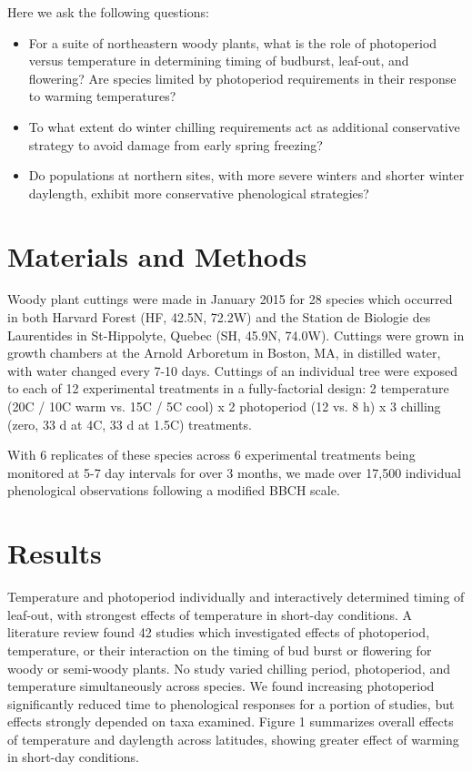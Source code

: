 \documentclass[11pt]{article}
\begin{document}
Here we ask the following questions:
\begin{itemize}
\item{For a suite of northeastern woody plants, what is the role of photoperiod versus temperature in determining timing of budburst, leaf-out, and flowering? Are species limited by photoperiod requirements in their response to warming temperatures?}
\item{To what extent do winter chilling requirements act as additional conservative strategy to avoid damage from early spring freezing?}
\item{Do populations at northern sites, with more severe winters and shorter winter daylength, exhibit more conservative phenological strategies?}
\end{itemize}



\section{Materials and Methods}

Woody plant cuttings were made in January 2015 for 28 species which occurred in both Harvard Forest (HF, 42.5\degree N, 72.2\degree W) and the Station de Biologie des Laurentides in St-Hippolyte, Quebec (SH, 45.9\degree N, 74.0\degree W). Cuttings were grown in growth chambers at the Arnold Arboretum in Boston, MA, in distilled water, with water changed every 7-10 days. Cuttings of an individual tree were exposed to each of 12 experimental treatments in a fully-factorial design: 2 temperature (20\degree C / 10\degree C warm vs. 15\degree C / 5\degree C cool) x 2 photoperiod (12 vs. 8 h) x 3 chilling (zero,  33 d at 4\degree C, 33 d at 1.5\degree C) treatments. 

With 6 replicates of these species across 6 experimental treatments being monitored at 5-7 day intervals for over 3 months, we made over 17,500 individual phenological observations following a modified BBCH scale.


\section{Results}

Temperature and photoperiod individually and interactively determined timing of leaf-out, with strongest effects of temperature in short-day conditions. A literature review found 42 studies which investigated effects of photoperiod, temperature, or their interaction on the timing of bud burst or flowering for woody or semi-woody plants.  No study varied chilling period, photoperiod, and temperature simultaneously across species. We found increasing photoperiod significantly reduced time to phenological responses for a portion of studies, but effects strongly depended on taxa examined. Figure 1 summarizes overall effects of temperature and daylength across latitudes, showing greater effect of warming in short-day conditions.
\end{document}
